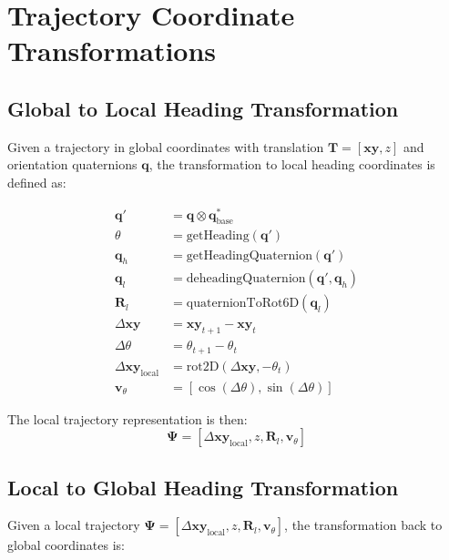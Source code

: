 


\section*{Trajectory Coordinate Transformations}

\subsection*{Global to Local Heading Transformation}
Given a trajectory in global coordinates with translation $\mathbf{T} = [\mathbf{xy}, z]$ and orientation quaternions $\mathbf{q}$, the transformation to local heading coordinates is defined as:

\begin{align}
    \mathbf{q}' &= \mathbf{q} \otimes \mathbf{q}_{\text{base}}^* \\
    \theta &= \text{getHeading}(\mathbf{q}') \\
    \mathbf{q}_h &= \text{getHeadingQuaternion}(\mathbf{q}') \\
    \mathbf{q}_l &= \text{deheadingQuaternion}(\mathbf{q}', \mathbf{q}_h) \\
    \mathbf{R}_l &= \text{quaternionToRot6D}(\mathbf{q}_l) \\
    \Delta\mathbf{xy} &= \mathbf{xy}_{t+1} - \mathbf{xy}_t \\
    \Delta\theta &= \theta_{t+1} - \theta_t \\
    \Delta\mathbf{xy}_{\text{local}} &= \text{rot2D}(\Delta\mathbf{xy}, -\theta_t) \\
    \mathbf{v}_{\theta} &= [\cos(\Delta\theta), \sin(\Delta\theta)]
\end{align}

The local trajectory representation is then:
\begin{equation}
    \mathbf{\Psi} = [\Delta\mathbf{xy}_{\text{local}}, z, \mathbf{R}_l, \mathbf{v}_{\theta}]
\end{equation}

\subsection*{Local to Global Heading Transformation}
Given a local trajectory $\mathbf{\Psi} = [\Delta\mathbf{xy}_{\text{local}}, z, \mathbf{R}_l, \mathbf{v}_{\theta}]$, the transformation back to global coordinates is:

